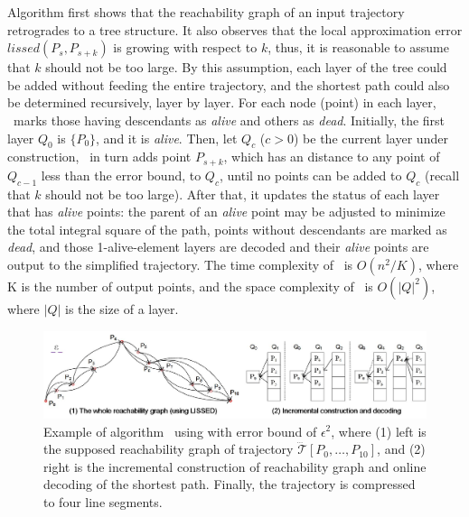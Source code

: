 {Algorithm \dagots first shows that the reachability graph of an input trajectory retrogrades to a tree structure. It also observes that the local approximation error $lissed(P_s,P_{s+k})$ is growing with respect to $k$, thus, it is reasonable to assume that $k$ should not be too large.
By this assumption, each layer of the tree could be added without feeding the entire trajectory, and the shortest path could also be determined recursively, \ie layer by layer.}
%
{For each node (point) in each layer, \dagots~marks those having descendants as \emph{alive} and others as \emph{dead}.
Initially, the first layer $Q_0$ is $\{P_0\}$, and it is \emph{alive}. }
%
{Then, let $Q_c$ ($c>0$) be the current layer under construction,
\dagots~in turn adds point $P_{s+k}$, which has an \lissed distance to any point of $Q_{c-1}$ less than the error bound, to $Q_c$, until no points can be added to $Q_c$ (recall that $k$ should not be too large). After that, it updates the status of each layer that has \emph{alive} points: the parent of an \emph{alive} point may be adjusted to minimize the total integral square \sed of the path, points without descendants are marked as \emph{dead}, and those 1-alive-element layers are decoded and their \emph{alive} points are output to the simplified trajectory. }
%
{The time complexity of \dagots~is $O(n^2/K)$, where K is the number of output points, and the space complexity of \dagots~is $O(|Q|^2)$, where $|Q|$ is the size of a layer.}

\begin{figure}[tb!]
	\centering
	\includegraphics[scale=0.79]{Figures/Fig-DOTS.jpg}
	\vspace{-2ex}
	\caption{\small {Example of algorithm \dagots~using \lissed with error bound of $\epsilon^2$, where (1) left is the supposed reachability graph of trajectory $\dddot{\mathcal{T}}[P_0, \ldots, P_{10}]$, and (2) right is the incremental construction of reachability graph and online decoding of the shortest path. Finally, the trajectory is compressed to four line segments.} }
	\vspace{-2ex}
	\label{fig:dots}
\end{figure}



